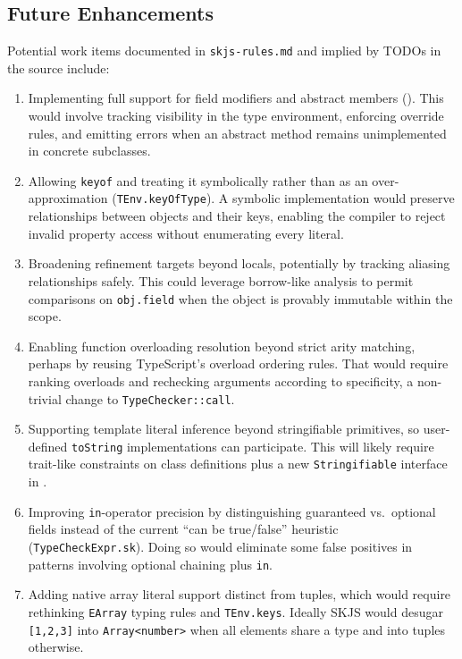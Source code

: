 \documentclass[11pt]{article}
\newcommand{\code}[1]{\path{#1}}
\begin{document}
\subsection{Future Enhancements}
Potential work items documented in \texttt{skjs-rules.md} and implied by TODOs in the source include:
\begin{enumerate}[leftmargin=*]
  \item Implementing full support for field modifiers and abstract members (\code{src/TypeCheckClass.sk}). This would involve tracking visibility in the type environment, enforcing override rules, and emitting errors when an abstract method remains unimplemented in concrete subclasses.
  \item Allowing \texttt{keyof} and treating it symbolically rather than as an over-approximation (\texttt{TEnv.keyOfType}). A symbolic implementation would preserve relationships between objects and their keys, enabling the compiler to reject invalid property access without enumerating every literal.
  \item Broadening refinement targets beyond locals, potentially by tracking aliasing relationships safely. This could leverage borrow-like analysis to permit comparisons on \texttt{obj.field} when the object is provably immutable within the scope.
  \item Enabling function overloading resolution beyond strict arity matching, perhaps by reusing TypeScript's overload ordering rules. That would require ranking overloads and rechecking arguments according to specificity, a non-trivial change to \texttt{TypeChecker::call}.
  \item Supporting template literal inference beyond stringifiable primitives, so user-defined \texttt{toString} implementations can participate. This will likely require trait-like constraints on class definitions plus a new \texttt{Stringifiable} interface in \code{import-stubs/@types}.
  \item Improving \texttt{in}-operator precision by distinguishing guaranteed vs.\ optional fields instead of the current ``can be true/false'' heuristic (\texttt{TypeCheckExpr.sk}). Doing so would eliminate some false positives in patterns involving optional chaining plus \texttt{in}.
  \item Adding native array literal support distinct from tuples, which would require rethinking \texttt{EArray} typing rules and \texttt{TEnv.keys}. Ideally SKJS would desugar \texttt{[1,2,3]} into \texttt{Array<number>} when all elements share a type and into tuples otherwise.
\end{enumerate}
\end{document}
